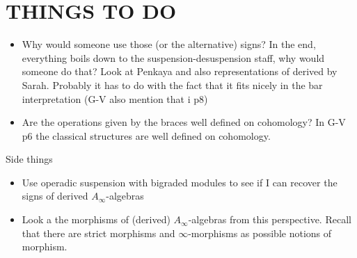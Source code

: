 \documentclass[twoside]{article}
\begin{document}
\section{THINGS TO DO}

\begin{itemize}
\item Why would someone use those (or the alternative) signs? In the end, everything boils down to the suspension-desuspension staff, why would someone do that? Look at Penkaya and also representations of derived by Sarah. Probably it has to do with the fact that it fits nicely in the bar interpretation (G-V also mention that i p8)
\item Are the operations given by the braces well defined on cohomology? In G-V p6 the classical structures are well defined on cohomology.
\end{itemize}

Side things
\begin{itemize}
\item Use operadic suspension with bigraded modules to see if I can recover the signs of derived $A_\infty$-algebras
\item Look a the morphisms of (derived) $A_\infty$-algebras from this perspective. Recall that there are strict morphisms and $\infty$-morphisms as possible notions of morphism.
\end{itemize}
\end{document}
